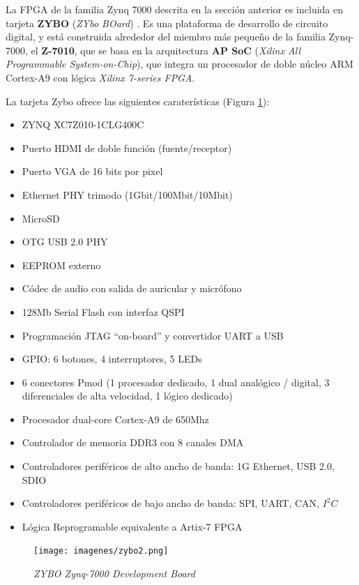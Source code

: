 La FPGA de la familia Zynq 7000 descrita en la sección anterior es incluida en tarjeta \textbf{ZYBO} (\textit{ZYbo BOard}) \cite{manual_zybo}. Es una plataforma de desarrollo de circuito 
digital, y está construida alrededor del miembro más pequeño de la familia Zynq-7000, el \textbf{Z-7010}, que se basa en la arquitectura 
\textbf{AP SoC} (\textit{Xilinx All Programmable System-on-Chip}), que integra un procesador de doble núcleo ARM Cortex-A9 con lógica \textit{Xilinx 7-series FPGA}.

La tarjeta Zybo ofrece las siguientes caraterísticas (Figura \ref{fig:zybo}):

\begin{itemize}
    \item ZYNQ XC7Z010-1CLG400C
    \item Puerto HDMI de doble función (fuente/receptor)
    \item Puerto VGA de 16 bits por pixel
    \item Ethernet PHY trimodo (1Gbit/100Mbit/10Mbit)
    \item MicroSD
    \item OTG USB 2.0 PHY
    \item EEPROM externo
    \item Códec de audio con salida de auricular y micrófono 
    \item 128Mb Serial Flash con interfaz QSPI
    \item Programación JTAG ``on-board'' y convertidor UART a USB
    \item GPIO: 6 botones, 4 interruptores, 5 LEDs
    \item 6 conectores Pmod (1 procesador dedicado, 1 dual analógico / digital, 3 diferenciales de alta velocidad, 1 lógico dedicado)
    \item Procesador dual-core Cortex-A9 de 650Mhz
    \item Controlador de memoria DDR3 con 8 canales DMA
    \item Controladores periféricos de alto ancho de banda: 1G Ethernet, USB 2.0, SDIO
    \item Controladores periféricos de bajo ancho de banda: SPI, UART, CAN, \(I^2C\)
    \item Lógica Reprogramable equivalente a Artix-7 FPGA
\end{itemize}

\begin{figure}[H]
    \centering
    \texttt{[image: imagenes/zybo2.png]}
    \caption{\textit{ZYBO Zynq-7000 Development Board \cite{manual_zybo}}}\label{fig:zybo}
\end{figure}

